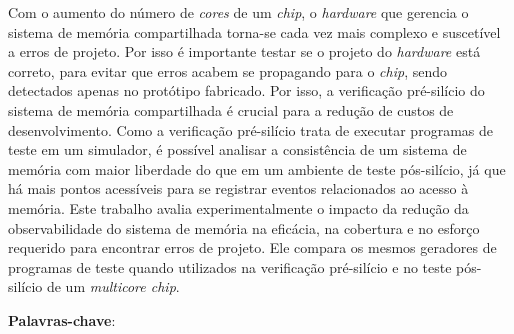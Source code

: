 \begin{resumo}
    Com o aumento do número de \textit{cores} de um \textit{chip}, o
    \textit{hardware} que gerencia o sistema de memória compartilhada torna-se
    cada vez mais complexo e suscetível a erros de projeto. Por isso é
    importante testar se o projeto do \textit{hardware} está correto, para
    evitar que erros acabem se propagando para o \textit{chip}, sendo
    detectados apenas no protótipo fabricado. Por isso, a verificação
    pré-silício do sistema de memória compartilhada é crucial para a redução de
    custos de desenvolvimento. Como a verificação pré-silício trata de executar
    programas de teste em um simulador, é possível analisar a consistência de
    um sistema de memória com maior liberdade do que em um ambiente de teste
    pós-silício, já que há mais pontos acessíveis para se registrar eventos
    relacionados ao acesso à memória. Este trabalho avalia experimentalmente o
    impacto da redução da observabilidade do sistema de memória na eficácia, na
    cobertura e no esforço requerido para encontrar erros de projeto. Ele
    compara os mesmos geradores de programas de teste quando utilizados na
    verificação pré-silício e no teste pós-silício de um \textit{multicore
    chip}.

    \vspace{\onelineskip}
    \noindent
    \textbf{Palavras-chave}: \listaassuntos%
\end{resumo}

\afterpage{\null\newpage}
